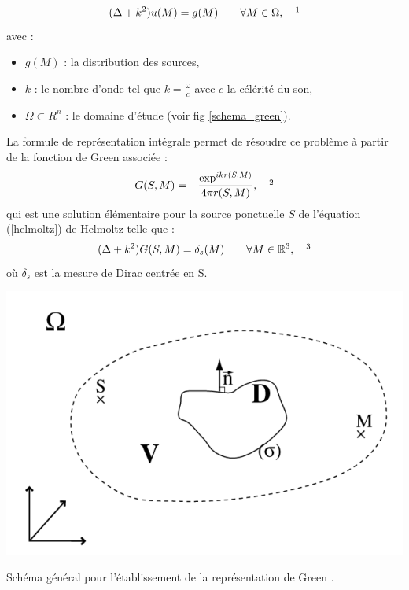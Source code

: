 \begin{equation} \label{helmoltz}
(\Delta + k^2)u(M) = g(M)	 	\qquad  \forall M  \in \Omega,
\ \ \ \footnotemark
\end{equation}
avec :
\begin{itemize}
\item $g(M)$ : la distribution des sources,
\item $k$ : le nombre d'onde tel que $k = \frac{\omega}{c}$ avec $c$ la célérité du son,
\item $\Omega  \subset R^n$ : le domaine d'étude (voir fig \ref{schema_green}).
\end{itemize}
%
La formule de représentation intégrale permet de résoudre ce problème à partir de la fonction de Green associée :
%
\begin{equation}
G(S,M) = -\frac{\exp^{ikr(S,M)}}{4\pi r(S,M)},
\ \ \ \footnotemark
\end{equation}
%
qui est une solution élémentaire pour la source ponctuelle $S$ de l'équation (\ref{helmoltz}) de Helmoltz telle que :
\begin{equation} \label{green}
(\Delta + k^2)G(S,M) = \delta_s(M)	 	\qquad  \forall M  \in \mathbb{R}^3,
\ \ \ \footnotemark
\end{equation}
où $\delta_s$ est la mesure de \gls{Dirac} centrée en S.

\begin{figureth}
	\includegraphics[width=0.6\linewidth]{images/green}
	\caption[Schéma général pour l'établissement de la représentation de Green]{Schéma général pour l'établissement de la représentation de Green \footnotemark.}
	\label{schema_green}
\end{figureth}


